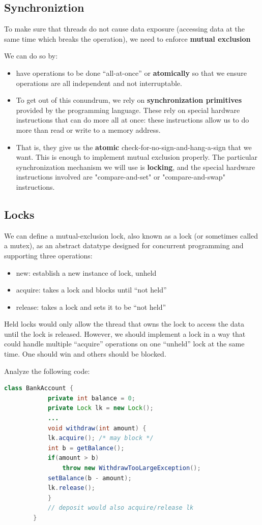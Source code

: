 \documentclass[letterpaper,12pt]{article}
\begin{document}
\subsection{Synchroniztion}
To make sure that threads do not cause data exposure (accessing data at the same time which breaks the operation), we need to enforce \textbf{mutual exclusion}

We can do so by:\begin{itemize}
      \item have operations to be done ``all-at-once'' or \textbf{atomically} so that we ensure operations are all independent and not interruptable. 
      \item To get out of this conundrum, we rely on \textbf{synchronization primitives} provided by the programming language. These rely on special hardware instructions that can do more all at once: these instructions allow us to do more than read or write to a memory address. 
      \item That is, they give us the \textbf{atomic} check-for-no-sign-and-hang-a-sign that we want. This is enough to implement mutual exclusion properly. The particular synchronization mechanism we will use is \textbf{locking}, and the special hardware instructions involved are "compare-and-set" or "compare-and-swap" instructions.
\end{itemize}

\subsection{Locks}
We can define a mutual-exclusion lock, also known as a lock (or sometimes called a mutex), as an abstract datatype designed for concurrent programming and supporting three operations:
\begin{itemize}
      \item new: establish a new instance of lock, unheld
      \item acquire: takes a lock and blocks until ``not held''
      \item release: takes a lock and sets it to be ``not held''
\end{itemize}
Held locks would only allow the thread that owns the lock to access the data until the lock is released. However, we should implement a lock in a way that could handle multiple ``acquire'' operations on one ``unheld'' lock at the same time. One should win and others should be blocked. 

Analyze the following code:
\begin{lstlisting}[language=Java]
      class BankAccount {
            private int balance = 0;
            private Lock lk = new Lock();
            ...
            void withdraw(int amount) {
            lk.acquire(); /* may block */
            int b = getBalance();
            if(amount > b)
                throw new WithdrawTooLargeException();
            setBalance(b - amount);
            lk.release();
            }
            // deposit would also acquire/release lk
        }  
\end{lstlisting}
\end{document}
